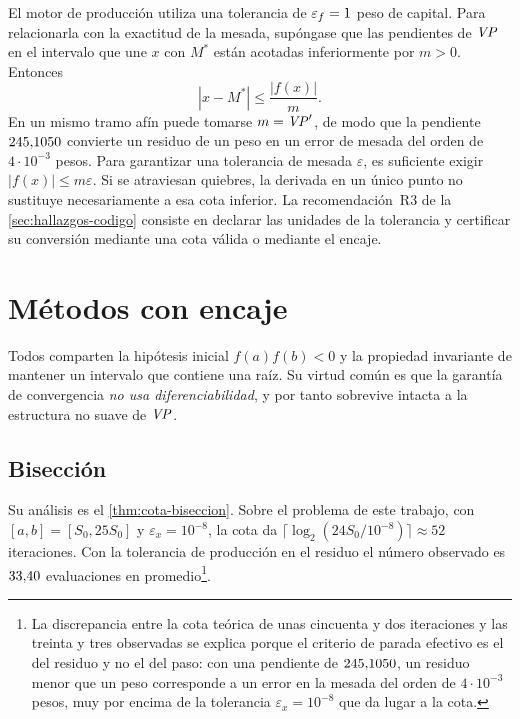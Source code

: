 \begin{criticism}
\label{crit:parada}
El motor de producción utiliza una tolerancia de
$\varepsilon_f=1$ peso de capital. Para relacionarla con la
exactitud de la mesada, supóngase que las pendientes de $\mathit{VP}$ en el intervalo
que une $x$ con $M^*$ están acotadas inferiormente por $m>0$. Entonces
\[
  |x-M^*|\le\frac{|f(x)|}{m}.
\]
En un mismo tramo afín puede tomarse $m=\mathit{VP}'$, de modo que la pendiente
$245{,}1050$ convierte un residuo de un peso en un error de mesada del
orden de $4\cdot10^{-3}$ pesos. Para garantizar una tolerancia de mesada
$\varepsilon$, es suficiente exigir $|f(x)|\le m\varepsilon$. Si se atraviesan
quiebres, la derivada en un único punto no sustituye necesariamente a esa cota
inferior. La recomendación~R3 de la \cref{sec:hallazgos-codigo} consiste en
declarar las unidades de la tolerancia y certificar su conversión mediante
una cota válida o mediante el encaje.
\end{criticism}

\section{Métodos con encaje}

Todos comparten la hipótesis inicial $f(a)f(b)<0$ y la propiedad invariante de
mantener un intervalo que contiene una raíz. Su virtud común es que la garantía de
convergencia \emph{no usa diferenciabilidad}, y por tanto sobrevive intacta a la
estructura no suave de $\mathit{VP}$.

\subsection{Bisección}

\begin{algorithm}[H]
\caption{Bisección}
\label{alg:biseccion}
\SetAlgoLined
{}
\end{algorithm}

Su análisis es el \cref{thm:cota-biseccion}. Sobre el problema de este trabajo, con
$[a,b]=[S_0,25S_0]$ y $\varepsilon_x=10^{-8}$, la cota da
$\lceil\log_2(24S_0/10^{-8})\rceil\approx52$ iteraciones. Con la tolerancia de
producción en el residuo el número observado es $33{,}40$ evaluaciones en
promedio\footnote{La discrepancia entre la cota teórica de unas cincuenta y dos iteraciones y las treinta y tres observadas se explica porque el criterio de parada efectivo es el del residuo y no el del paso: con una pendiente de $245{,}1050$, un residuo menor que un peso corresponde a un error en la mesada del orden de $4\cdot10^{-3}$ pesos, muy por encima de la tolerancia $\varepsilon_x=10^{-8}$ que da lugar a la cota.}.

